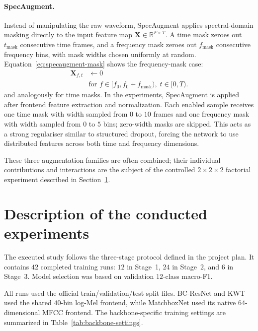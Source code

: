 \documentclass[11pt]{article}
\begin{document}
\paragraph{SpecAugment.}
Instead of manipulating the raw waveform, SpecAugment \cite{specaugment} applies spectral-domain masking directly to the input feature map $\mathbf{X} \in \mathbb{R}^{F \times T}$. 
A time mask zeroes out $t_{\text{mask}}$ consecutive time frames, and a frequency mask zeroes out $f_{\text{mask}}$ consecutive frequency bins, with mask widths chosen uniformly at random. Equation~\eqref{eq:specaugment-mask} shows the frequency-mask case:
\begin{equation}
    \label{eq:specaugment-mask}
    \begin{aligned}
        \mathbf{X}_{f, t} &\leftarrow 0 \\
        &\text{for } f \in [f_0, f_0 + f_{\text{mask}}),\; t \in [0, T).
    \end{aligned}
\end{equation}
and analogously for time masks. 
In the experiments, SpecAugment is applied after frontend feature extraction and normalization. Each enabled sample receives one time mask with width sampled from \(0\) to \(10\) frames and one frequency mask with width sampled from \(0\) to \(5\) bins; zero-width masks are skipped.
This acts as a strong regulariser similar to structured dropout, forcing the network to use distributed features across both time and frequency dimensions.

These three augmentation families are often combined; their individual contributions and interactions are the subject of the controlled \(2\times2\times2\) factorial experiment described in Section~\ref{sec:experiments}.



\section{Description of the conducted experiments}
\label{sec:experiments}
The executed study follows the three-stage protocol defined in the project plan. It contains \(42\) completed training runs: \(12\) in Stage~1, \(24\) in Stage~2, and \(6\) in Stage~3. Model selection was based on validation \(12\)-class macro-F1.

All runs used the official train/validation/test split files. BC-ResNet and KWT used the shared \(40\)-bin log-Mel frontend, while MatchboxNet used its native \(64\)-dimensional MFCC frontend. The backbone-specific training settings are summarized in Table~\ref{tab:backbone-settings}.
\end{document}
